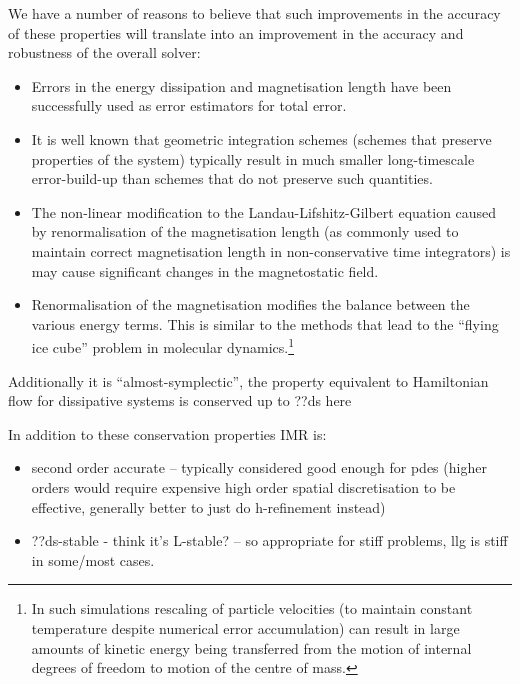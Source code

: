We have a number of reasons to believe that such improvements in the accuracy of these properties will translate into an improvement in the accuracy and robustness of the overall solver:
\begin{itemize}
\item Errors in the energy dissipation\cite{Albuquerque2001} and magnetisation length\cite{Chantrell2001} have been successfully used as error estimators for total error.

\item It is well known that geometric integration schemes (\ie schemes that preserve properties of the system) typically result in much smaller long-timescale error-build-up than schemes that do not preserve such quantities.\cite[pg. 77]{Iserles2009}

\item The non-linear modification to the Landau-Lifshitz-Gilbert equation caused by renormalisation of the magnetisation length (as commonly used to maintain correct magnetisation length in non-conservative time integrators) is may cause significant changes in the magnetostatic field.\cite{Lewis2003}

\item Renormalisation of the magnetisation modifies the balance between the various energy terms.
  This is similar to the methods that lead to the ``flying ice cube'' problem in molecular dynamics.\cite{Harvey1998}\footnote{In such simulations rescaling of particle velocities (to maintain constant temperature despite numerical error accumulation) can result in large amounts of kinetic energy being transferred from the motion of internal degrees of freedom to motion of the centre of mass.}
\end{itemize}

Additionally it is ``almost-symplectic'', \ie the property equivalent to Hamiltonian flow for  dissipative systems is conserved up to \cite{daquino2005}\cite{??ds-older-paper for this?} ??ds here

In addition to these conservation properties IMR is:
\begin{itemize}
\item second order accurate -- typically considered good enough for pdes (higher orders would require expensive high order spatial discretisation to be effective, generally better to just do h-refinement instead) \cite{Matthias}
\item ??ds-stable - think it's L-stable? \cite{??ds} -- so appropriate for stiff problems, llg is stiff in some/most cases\cite{??ds}.
\end{itemize}

